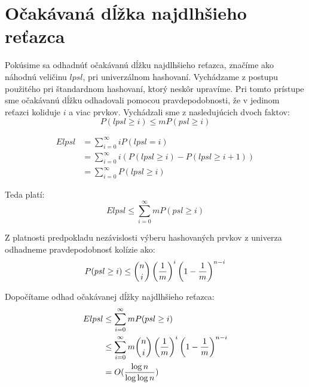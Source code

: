 \chapter{Očakávaná dĺžka najdlhšieho reťazca}

Pokúsime sa odhadnúť očakávanú dĺžku najdlhšieho reťazca, značíme ako náhodnú veličinu $lpsl$,  pri univerzálnom hashovaní. Vychádzame z postupu použitého pri štandardnom hashovaní, ktorý neskôr upravíme. Pri tomto prístupe sme očakávanú dĺžku odhadovali pomocou pravdepodobnosti, že v jedinom reťazci koliduje $i$ a viac prvkov. Vychádzali sme z nasledujúcich dvoch faktov:
\begin{displaymath}
P(lpsl \geq i) \leq m P(psl \geq i)
\end{displaymath}

\begin{displaymath}
\begin{split}
E lpsl	& = \displaystyle \sum_{i=0}^{\infty} i P(lpsl = i) \\
		& = \displaystyle \sum_{i = 0}^{\infty} i (P(lpsl \geq i) - P(lpsl \geq i + 1)) \\ 
		& = \displaystyle \sum_{i = 0}^{\infty} P(lpsl \geq i)
\end{split}
\end{displaymath}

Teda platí:
\begin{displaymath}
E lpsl \leq \displaystyle \sum_{i = 0}^{\infty} m P(psl \geq i)
\end{displaymath}

Z platnosti predpokladu nezávislosti výberu hashovaných prvkov z univerza od\-had\-ne\-me pravdepodobnosť kolízie ako:
\begin{displaymath}
P(psl \geq i) \leq \dbinom{n}{i}\left(\frac{1}{m}\right)^i\left(1 - \frac{1}{m}\right)^{n-i}
\end{displaymath}

Dopočítame odhad očakávanej dĺžky najdlhšieho reťazca:
\begin{displaymath}
\begin{split}
E lpsl	& \leq \displaystyle \sum_{i = 0}^{\infty} m P(psl \geq i) \\
		& \leq \displaystyle \sum_{i = 0}^{\infty} m \dbinom{n}{i}\left(\frac{1}{m}\right)^i\left(1 - \frac{1}{m}\right)^{n-i} \\
		& = O(\frac{\log n}{\log \log n})
\end{split}
\end{displaymath}

